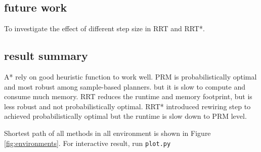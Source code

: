\documentclass[conference]{IEEEtran}
\begin{document}
\subsection{future work}
To investigate the effect of different step size in RRT and RRT*.

\subsection{result summary}
A* rely on good heuristic function to work well.
PRM is probabilistically optimal and most robust among sample-based planners. 
but it is slow to compute and consume much memory.
RRT reduces the runtime and memory footprint, but is less robust and not probabilistically optimal.
RRT* introduced rewiring step to achieved probabilistically optimal but the runtime is slow down to PRM level.

\appendix
Shortest path of all methods in all environment is shown in Figure \ref{fig:environments}.
For interactive result, run \texttt{plot.py}
\end{document}
